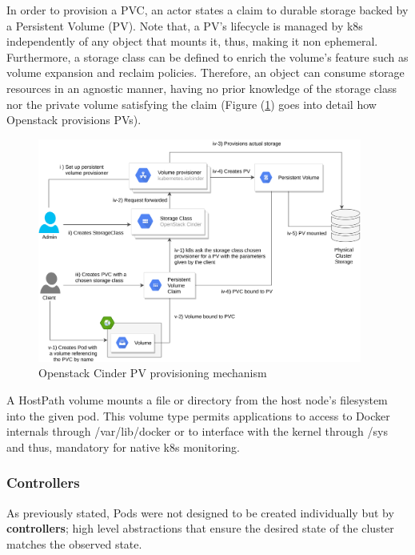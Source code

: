 \documentclass[11pt]{article}
\begin{document}
In order to provision a PVC, an actor states a claim to durable storage backed by a Persistent Volume (PV). Note that, a PV's lifecycle is managed by k8s independently of any object that mounts it, thus, making it non ephemeral. Furthermore, a storage class can be defined to enrich the volume's feature such as volume expansion and reclaim policies. Therefore, an object can consume storage resources in an agnostic manner, having no prior knowledge of the storage class nor the private volume satisfying the claim (Figure (\ref{fig:k8s_pv}) goes into detail how Openstack provisions PVs).

\begin{figure}[h]
    \centering
    \includegraphics[width=0.95\textwidth]{k8s_pv.png}
    \caption{Openstack Cinder PV provisioning mechanism}
    \label{fig:k8s_pv}
\end{figure}


\vspace{-5mm} A HostPath volume mounts a file or directory from the host node’s filesystem into the given pod. This volume type permits applications to access to Docker internals through /var/lib/docker or to interface with the kernel through /sys and thus, mandatory for native k8s monitoring. 

\subsubsection{Controllers}

\hspace{5mm} As previously stated, Pods were not designed to be created individually but by \textbf{controllers}; high level abstractions that ensure the desired state of the cluster matches the observed state. 
\end{document}
